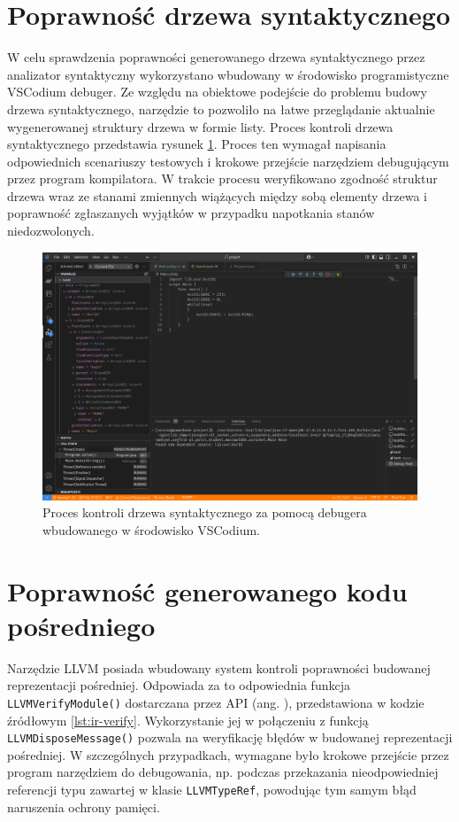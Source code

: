 \section{Poprawność drzewa syntaktycznego}
W celu sprawdzenia poprawności generowanego drzewa syntaktycznego przez analizator syntaktyczny wykorzystano wbudowany w środowisko programistyczne VSCodium debuger. Ze względu na obiektowe podejście do problemu budowy drzewa syntaktycznego, narzędzie to pozwoliło na łatwe przeglądanie aktualnie wygenerowanej struktury drzewa w formie listy. Proces kontroli drzewa syntaktycznego przedstawia rysunek \ref{fig:vscodium-debug-ast}. Proces ten wymagał napisania odpowiednich scenariuszy testowych i krokowe przejście narzędziem debugującym przez program kompilatora. W trakcie procesu weryfikowano zgodność struktur drzewa wraz ze stanami zmiennych wiążących między sobą elementy drzewa i poprawność zgłaszanych wyjątków w przypadku napotkania stanów niedozwolonych.

\begin{figure}
\centering
	\includegraphics[width=1\textwidth]{graf/vscodium-debug-ast.png}
	\caption{Proces kontroli drzewa syntaktycznego za pomocą debugera wbudowanego w środowisko VSCodium.}
\label{fig:vscodium-debug-ast}
\end{figure}

\section{Poprawność generowanego kodu pośredniego}
Narzędzie LLVM posiada wbudowany system kontroli poprawności budowanej reprezentacji pośredniej. Odpowiada za to odpowiednia funkcja \lstinline|LLVMVerifyModule()| dostarczana przez API (ang. ), przedstawiona w kodzie źródłowym \ref{lst:ir-verify}. Wykorzystanie jej w połączeniu z funkcją \lstinline|LLVMDisposeMessage()| pozwala na weryfikację błędów w budowanej reprezentacji pośredniej. W szczególnych przypadkach, wymagane było krokowe przejście przez program narzędziem do debugowania, np. podczas przekazania nieodpowiedniej referencji typu zawartej w klasie \lstinline|LLVMTypeRef|, powodując tym samym błąd naruszenia ochrony pamięci.


